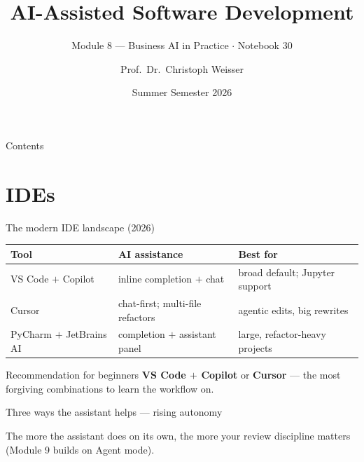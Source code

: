 \documentclass[aspectratio=169,11pt]{beamer}
\title{AI-Assisted Software Development}
\subtitle{Module 8 --- Business AI in Practice $\cdot$ Notebook 30}
\author{Prof.\ Dr.\ Christoph Weisser}
\institute{HSBI}
\date{Summer Semester 2026}
\begin{document}
\begin{frame}\titlepage\end{frame}

\begin{frame}{Contents}
  \tableofcontents[hideallsubsections]
\end{frame}

\section{IDEs}
\begin{frame}{The modern IDE landscape (2026)}
  \small
  \begin{center}
  \begin{tabular}{lp{4.4cm}p{3.6cm}}
    \toprule
    \textbf{Tool} & \textbf{AI assistance} & \textbf{Best for} \\
    \midrule
    VS Code $+$ Copilot & inline completion $+$ chat & broad default; Jupyter support \\
    Cursor              & chat-first; multi-file refactors & agentic edits, big rewrites \\
    PyCharm $+$ JetBrains AI & completion $+$ assistant panel & large, refactor-heavy projects \\
    \bottomrule
  \end{tabular}
  \end{center}
  \begin{exampleblock}{Recommendation for beginners}
    \textbf{VS Code $+$ Copilot} or \textbf{Cursor} --- the most forgiving combinations to learn the workflow on.
  \end{exampleblock}
\end{frame}

\begin{frame}{Three ways the assistant helps --- rising autonomy}
  \begin{center}
  \end{center}
  {\footnotesize The more the assistant does on its own, the more your review discipline matters (Module 9 builds on Agent mode).}
\end{frame}
\end{document}
